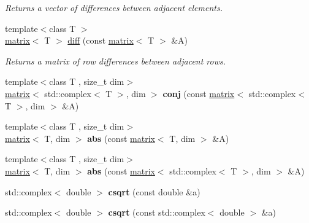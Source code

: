 \begin{DoxyCompactItemize}
\begin{DoxyCompactList}\small\item\em Returns a vector of differences between adjacent elements. \end{DoxyCompactList}\item 
{\footnotesize template$<$class T $>$ }\\\hyperlink{classkeycpp_1_1matrix}{matrix}$<$ T $>$ \hyperlink{namespacekeycpp_abb4e57814fd30b7b8d4845bbc16c73e9}{diff} (const \hyperlink{classkeycpp_1_1matrix}{matrix}$<$ T $>$ \&A)
\begin{DoxyCompactList}\small\item\em Returns a matrix of row differences between adjacent rows. \end{DoxyCompactList}\item 
\hypertarget{namespacekeycpp_a422c63d9cf20e676efbcefd445698aca}{{\footnotesize template$<$class T , size\-\_\-t dim$>$ }\\\hyperlink{classkeycpp_1_1matrix}{matrix}$<$ std\-::complex$<$ T $>$, dim $>$ {\bfseries conj} (const \hyperlink{classkeycpp_1_1matrix}{matrix}$<$ std\-::complex$<$ T $>$, dim $>$ \&A)}\label{namespacekeycpp_a422c63d9cf20e676efbcefd445698aca}

\item 
\hypertarget{namespacekeycpp_aeaeb417b7e61b4bbe200edc1315c7d2e}{{\footnotesize template$<$class T , size\-\_\-t dim$>$ }\\\hyperlink{classkeycpp_1_1matrix}{matrix}$<$ T, dim $>$ {\bfseries abs} (const \hyperlink{classkeycpp_1_1matrix}{matrix}$<$ T, dim $>$ \&A)}\label{namespacekeycpp_aeaeb417b7e61b4bbe200edc1315c7d2e}

\item 
\hypertarget{namespacekeycpp_a6f7d77410749bcf5a36793e3754e357b}{{\footnotesize template$<$class T , size\-\_\-t dim$>$ }\\\hyperlink{classkeycpp_1_1matrix}{matrix}$<$ T, dim $>$ {\bfseries abs} (const \hyperlink{classkeycpp_1_1matrix}{matrix}$<$ std\-::complex$<$ T $>$, dim $>$ \&A)}\label{namespacekeycpp_a6f7d77410749bcf5a36793e3754e357b}

\item 
\hypertarget{namespacekeycpp_a952e5296774667c3be4e792b5cd980da}{std\-::complex$<$ double $>$ {\bfseries csqrt} (const double \&a)}\label{namespacekeycpp_a952e5296774667c3be4e792b5cd980da}

\item 
\hypertarget{namespacekeycpp_a8faa7912f1f198c5185cb6a36cfd2fb2}{std\-::complex$<$ double $>$ {\bfseries csqrt} (const std\-::complex$<$ double $>$ \&a)}\label{namespacekeycpp_a8faa7912f1f198c5185cb6a36cfd2fb2}


\end{DoxyCompactItemize}
